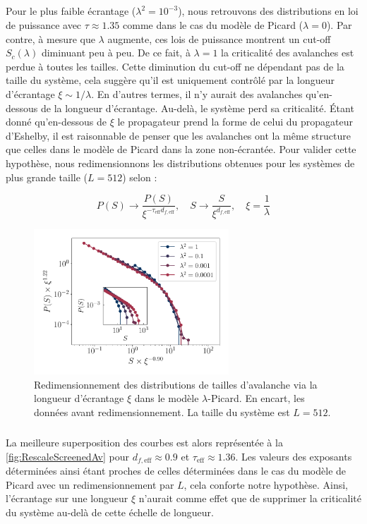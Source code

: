 \subparagraph{}Pour le plus faible écrantage ($\lambda^2 = 10^{-3}$), nous retrouvons des distributions en loi de puissance avec $\tau \approx 1.35$ comme dans le cas du modèle de Picard ($\lambda = 0$). Par contre, à mesure que $\lambda$ augmente, ces lois de puissance montrent un cut-off $S_c(\lambda)$ diminuant peu à peu. De ce fait, à $\lambda=1$ la criticalité des avalanches est perdue à toutes les tailles. Cette diminution du cut-off ne dépendant pas de la taille du système, cela suggère qu'il est uniquement contrôlé par la longueur d'écrantage $\xi \sim 1/\lambda$. En d'autres termes, il n'y aurait des avalanches qu'en-dessous de la longueur d'écrantage. Au-delà, le système perd sa criticalité. Étant donné qu'en-dessous de $\xi$ le propagateur prend la forme de celui du propagateur d'Eshelby, il est raisonnable de penser que les avalanches ont la même structure que celles dans le modèle de Picard dans la zone non-écrantée. Pour valider cette hypothèse, nous redimensionnons les distributions obtenues pour les systèmes de plus grande taille ($L=512$) selon :

\begin{equation}
	P(S) \rightarrow \frac{P(S)}{\xi^{-\tau_\text{eff}d_{f,\text{eff}}}},\quad S\rightarrow \frac{S}{\xi^{d_{f,\text{eff}}}}, \quad \xi = \frac{1}{\lambda}
\end{equation}

\begin{figure}[h]
	\centering
	\includegraphics[width=0.65\textwidth]{Chapitre6/Figures/RescaleScreenedAv.pdf}
	
	\caption{Redimensionnement des distributions de tailles d'avalanche via la longueur d'écrantage $\xi$ dans le modèle $\lambda$-Picard. En encart, les données avant redimensionnement. La taille du système est $L=512$.}
	\label{fig:RescaleScreenedAv}
\end{figure}

\subparagraph{}La meilleure superposition des courbes est alors représentée à la \autoref{fig:RescaleScreenedAv} pour $d_{f,\text{eff}}\approx 0.9$ et $\tau_\text{eff} \approx 1.36$. Les valeurs des exposants déterminées ainsi étant proches de celles déterminées dans le cas du modèle de Picard avec un redimensionnement par $L$, cela conforte notre hypothèse. Ainsi, l'écrantage sur une longueur $\xi$ n'aurait comme effet que de supprimer la criticalité du système au-delà de cette échelle de longueur.

